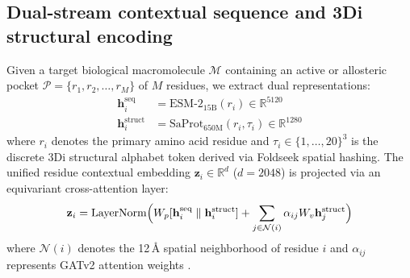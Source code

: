 \documentclass[11pt,a4paper]{article}
\begin{document}
\subsection*{Dual-stream contextual sequence and 3Di structural encoding}
Given a target biological macromolecule $\mathcal{M}$ containing an active or allosteric pocket $\mathcal{P} = \{r_1, r_2, \dots, r_M\}$ of $M$ residues, we extract dual representations:
\begin{align}
\mathbf{h}_i^{\text{seq}} &= \text{ESM-2}_{15\text{B}}(r_i) \in \mathbb{R}^{5120} \\
\mathbf{h}_i^{\text{struct}} &= \text{SaProt}_{650\text{M}}(r_i, \tau_i) \in \mathbb{R}^{1280}
\end{align}
where $r_i$ denotes the primary amino acid residue and $\tau_i \in \{1, \dots, 20\}^3$ is the discrete 3Di structural alphabet token derived via Foldseek spatial hashing. The unified residue contextual embedding $\mathbf{z}_i \in \mathbb{R}^{d}$ ($d = 2048$) is projected via an equivariant cross-attention layer:
\begin{equation}
\mathbf{z}_i = \text{LayerNorm}\Bigl( W_p [\mathbf{h}_i^{\text{seq}} \parallel \mathbf{h}_i^{\text{struct}}] + \sum_{j \in \mathcal{N}(i)} \alpha_{ij} W_v \mathbf{h}_j^{\text{struct}} \Bigr)
\end{equation}
where $\mathcal{N}(i)$ denotes the 12\,{\AA} spatial neighborhood of residue $i$ and $\alpha_{ij}$ represents GATv2 attention weights \cite{brody2022attentive}.

\end{document}
